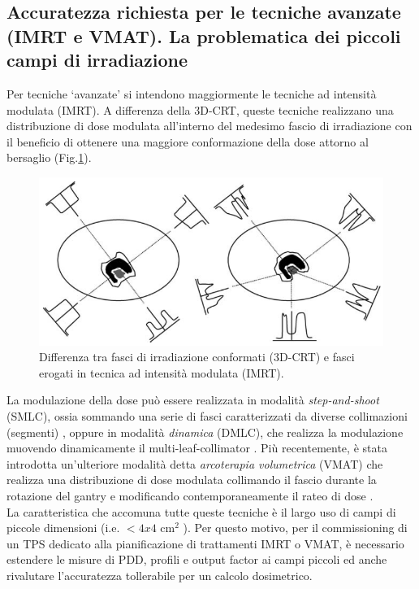 \subsection{Accuratezza richiesta per le tecniche avanzate (IMRT e VMAT). La problematica dei piccoli campi di irradiazione}
\label{sec:accu_spec}
Per tecniche `avanzate' si intendono maggiormente le tecniche ad intensità modulata (IMRT). A differenza della 3D-CRT, queste tecniche realizzano una distribuzione di dose modulata all'interno del medesimo fascio di irradiazione con il beneficio di ottenere una maggiore conformazione della dose attorno al bersaglio \cite{ICRU2010} (Fig.\ref{fig:3D_IMRT}).\\
\begin{figure}
\centering
\includegraphics[width=\textwidth]{./cap2/3D_IMRT.png}
\caption{Differenza tra fasci di irradiazione conformati (3D-CRT) e fasci erogati in tecnica ad intensità modulata (IMRT).}
\label{fig:3D_IMRT}
\end{figure}
La modulazione della dose può essere realizzata in modalità \textit{step-and-shoot} (SMLC), ossia sommando una serie di fasci caratterizzati da diverse collimazioni (segmenti) \cite{Bortfeld1994}, oppure in modalità \textit{dinamica}  (DMLC), che realizza la modulazione muovendo dinamicamente il multi-leaf-collimator \cite{LING1996}. Più recentemente, è stata introdotta un'ulteriore modalità detta \textit{arcoterapia volumetrica} (VMAT) che realizza una distribuzione di dose modulata collimando il fascio durante la rotazione del gantry e modificando contemporaneamente il rateo di dose \cite{Otto2008}.\\
La caratteristica che accomuna tutte queste tecniche è il largo uso di campi di piccole dimensioni (i.e. $<4x4$ cm$^2$ \cite{Das2008}). Per questo motivo, per il commissioning di un TPS dedicato alla pianificazione di trattamenti IMRT o VMAT, è necessario estendere le misure di PDD, profili e output factor ai campi piccoli ed anche rivalutare l'accuratezza tollerabile per un calcolo dosimetrico.

